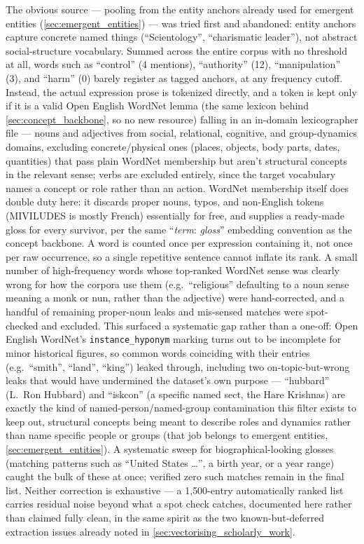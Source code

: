 The obvious source — pooling from the entity anchors already used for emergent entities (\ref{sec:emergent_entities}) — was tried first and abandoned: entity anchors capture concrete named things (\enquote{Scientology}, \enquote{charismatic leader}), not abstract social-structure vocabulary. Summed across the entire corpus with no threshold at all, words such as \enquote{control} (4 mentions), \enquote{authority} (12), \enquote{manipulation} (3), and \enquote{harm} (0) barely register as tagged anchors, at any frequency cutoff. Instead, the actual expression prose is tokenized directly, and a token is kept only if it is a valid Open English WordNet lemma (the same lexicon behind \ref{sec:concept_backbone}, so no new resource) falling in an in-domain lexicographer file — nouns and adjectives from social, relational, cognitive, and group-dynamics domains, excluding concrete/physical ones (places, objects, body parts, dates, quantities) that pass plain WordNet membership but aren't structural concepts in the relevant sense; verbs are excluded entirely, since the target vocabulary names a concept or role rather than an action. WordNet membership itself does double duty here: it discards proper nouns, typos, and non-English tokens (MIVILUDES is mostly French) essentially for free, and supplies a ready-made gloss for every survivor, per the same \enquote{\textit{term}: \textit{gloss}} embedding convention as the concept backbone. A word is counted once per expression containing it, not once per raw occurrence, so a single repetitive sentence cannot inflate its rank. A small number of high-frequency words whose top-ranked WordNet sense was clearly wrong for how the corpora use them (e.g.\ \enquote{religious} defaulting to a noun sense meaning a monk or nun, rather than the adjective) were hand-corrected, and a handful of remaining proper-noun leaks and mis-sensed matches were spot-checked and excluded. This surfaced a systematic gap rather than a one-off: Open English WordNet's \texttt{instance\_hyponym} marking turns out to be incomplete for minor historical figures, so common words coinciding with their entries (e.g.\ \enquote{smith}, \enquote{land}, \enquote{king}) leaked through, including two on-topic-but-wrong leaks that would have undermined the dataset's own purpose — \enquote{hubbard} (L.\ Ron Hubbard) and \enquote{iskcon} (a specific named sect, the Hare Krishnas) are exactly the kind of named-person/named-group contamination this filter exists to keep out, structural concepts being meant to describe roles and dynamics rather than name specific people or groups (that job belongs to emergent entities, \ref{sec:emergent_entities}). A systematic sweep for biographical-looking glosses (matching patterns such as \enquote{United States \ldots}, a birth year, or a year range) caught the bulk of these at once; verified zero such matches remain in the final list. Neither correction is exhaustive — a 1{,}500-entry automatically ranked list carries residual noise beyond what a spot check catches, documented here rather than claimed fully clean, in the same spirit as the two known-but-deferred extraction issues already noted in \ref{sec:vectorising_scholarly_work}.

